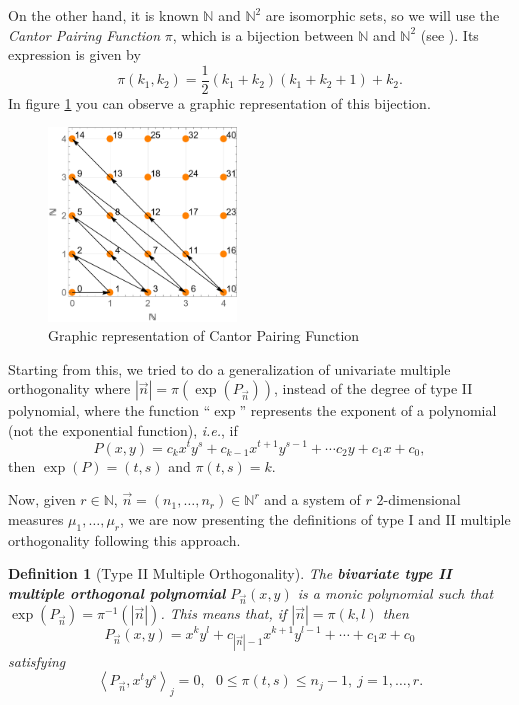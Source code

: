 \documentclass[12pt,a4]{report}
\theoremstyle{plain}
\newtheorem{definition}[theorem]{Definition}
\newcommand{\N}[0]{\mathbb{N}}
\newcommand{\prodesc}[2]{\left\langle #1 , #2 \right\rangle}
\begin{document}
On the other hand, it is known $\N$ and $\N^2$ are isomorphic sets, so we will use the \emph{Cantor Pairing Function} $\pi$, which is a bijection between $\N$ and $\N^2$ (see \cite{Lisi}). Its expression is given by 
$$
\pi(k_1, k_2) = \dfrac{1}{2}(k_1 + k_2)(k_1 + k_2 + 1) + k_2.
$$
In figure  \ref{fig:Cantor} you can observe a graphic representation of this bijection.

\begin{figure}[h]
    \centering\includegraphics[width=5cm]{./img/Cantor.png}
    \caption{Graphic representation of Cantor Pairing Function}
    \label{fig:Cantor}
  \end{figure}

Starting from this, we tried to do a generalization of univariate multiple orthogonality where $|\vec n| = \pi(\exp(P_{\vec n}))$, instead of the degree of type II polynomial, where the function ``$\exp$'' represents the exponent of a polynomial (not the exponential function), \textit{i.e.}, if $$P(x,y)= c_{k} x^t y^s + c_{k-1} x^{t+1} y^{s-1} + \cdots c_2 y + c_1 x + c_0,$$ then $\exp(P)=(t,s)$ and $\pi(t,s)=k$. %

Now, given $r\in\N$, $\vec n = (n_1,\dots, n_r)\in\N^r$ and a system of $r$ $2$-dimensional measures $\mu_1, \dots, \mu_r$, we are now presenting the definitions of type I and II multiple orthogonality following this approach. 

\begin{definition}[Type II Multiple Orthogonality]
  The \textbf{bivariate type II multiple orthogonal polynomial} $P_{\vec n}(x,y)$ is a monic polynomial such that $\exp(P_{\vec n})=\pi^{-1}(|\vec n|)$. This means that, if $|\vec n|=\pi(k,l)$ then 
  $$
    P_{\vec n}(x,y) = x^k y^l + c_{|\vec n|-1} x^{k+1} y^{l-1} + \cdots + c_1 x + c_0
  $$
  satisfying
  \begin{equation}
    \label{eq:typeII-MOP-2-app}
    \prodesc{P_{\vec n}}{x^t y^s}_j = 0, \ \ \ 0\leq \pi(t,s)\leq n_j-1, \ j=1,\dots,r.
  \end{equation}    
\end{definition}
\end{document}
